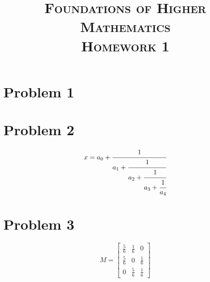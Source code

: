 \documentclass{article}
\title{
    \textsc{Foundations of Higher Mathematics\\Homework 1}
}
\date{}
\begin{document}
\maketitle

\section*{Problem 1}
\lipsum[1]

\section*{Problem 2}
\begin{equation}
  x = a_0 + \cfrac{1}{a_1
          + \cfrac{1}{a_2
          + \cfrac{1}{a_3 + \cfrac{1}{a_4} } } }
\end{equation}
\lipsum[2]

\section*{Problem 3}
\begin{equation}
M = \begin{bmatrix}
       \frac{5}{6} & \frac{1}{6} & 0           \\[0.3em]
       \frac{5}{6} & 0           & \frac{1}{6} \\[0.3em]
       0           & \frac{5}{6} & \frac{1}{6}
     \end{bmatrix}
\end{equation}
\end{document}
